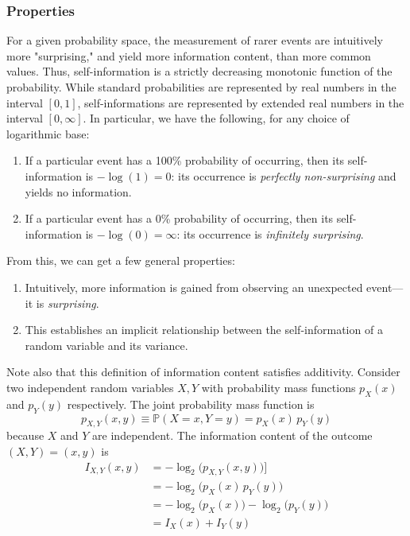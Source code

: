 \documentclass{article}
\begin{document}
  \subsubsection{Properties}
  For a given probability space, the measurement of rarer events are intuitively more "surprising," and yield more information content, than more common values. Thus, self-information is a strictly decreasing monotonic function of the probability. While standard probabilities are represented by real numbers in the interval $[0,1]$, self-informations are represented by extended real numbers in the interval $[0,\infty]$. In particular, we have the following, for any choice of logarithmic base:
  \begin{enumerate}
      \item If a particular event has a 100\% probability of occurring, then its self-information is $-\log (1) = 0$: its occurrence is \textit{perfectly non-surprising} and yields no information.
      \item If a particular event has a 0\% probability of occurring, then its self-information is $- \log (0) = \infty$: its occurrence is \textit{infinitely surprising}.
  \end{enumerate}
  From this, we can get a few general properties: 
  \begin{enumerate}
      \item Intuitively, more information is gained from observing an unexpected event—it is \textit{surprising}.
      \item This establishes an implicit relationship between the self-information of a random variable and its variance. 
  \end{enumerate}
  Note also that this definition of information content satisfies additivity. Consider two independent random variables $X, Y$ with probability mass functions $p_X (x)$ and $p_Y (y)$ respectively. The joint probability mass function is 
  \[p_{X, Y} (x, y) \equiv \mathbb{P} (X = x, Y = y) = p_X (x) \, p_Y (y)\]
  because $X$ and $Y$ are independent. The information content of the outcome $(X, Y) = (x, y)$ is 
  \begin{align*}
      I_{X, Y} (x, y) & = - \log_2 \big( p_{X, Y} (x, y) \big) ]\\
      & = -\log_2 \big(p_X (x) \, p_Y (y)\big) \\
      & = - \log_2 \big( p_X (x) \big) - \log_2 \big( p_Y (y) \big) \\
      & = I_X (x) + I_Y (y)
  \end{align*}
\end{document}
